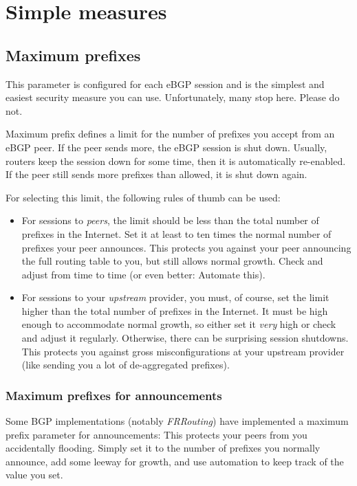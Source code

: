 \section{Simple measures}
\subsection{Maximum prefixes}
\label{maxprefix}
This parameter is configured for each eBGP session and is the simplest and easiest security measure you can use. Unfortunately, many stop here. Please do not.

Maximum prefix defines a limit for the number of prefixes you accept from an eBGP peer. If the peer sends more, the eBGP session is shut down. Usually, routers keep the session down for some time, then it is automatically re-enabled. If the peer still sends more prefixes than allowed, it is shut down again.

For selecting this limit, the following rules of thumb can be used:
\begin{itemize}
  \item For sessions to \emph{peers}, the limit should be less than the total number of prefixes in the Internet. Set it at least to ten times the normal number of prefixes your peer announces. This protects you against your peer announcing the full routing table to you, but still allows normal growth. Check and adjust from time to time (or even better: Automate this).
  \item For sessions to your \emph{upstream} provider, you must, of course, set the limit higher than the total number of prefixes in the Internet. It must be high enough to accommodate normal growth, so either set it \emph{very} high or check and adjust it regularly. Otherwise, there can be surprising session shutdowns. This protects you against gross misconfigurations at your upstream provider (like sending you a lot of de-aggregated prefixes).
\end{itemize}

\subsubsection{Maximum prefixes for announcements}
Some BGP implementations (notably \emph{FRRouting}) have implemented a maximum prefix parameter for announcements: This protects your peers from you accidentally flooding. Simply set it to the number of prefixes you normally announce, add some leeway for growth, and use automation to keep track of the value you set.

